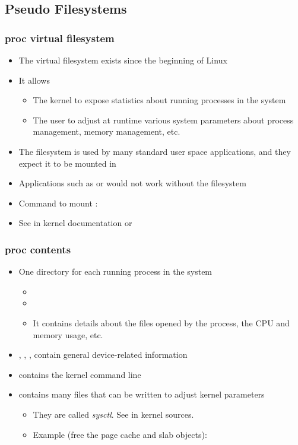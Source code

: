 \subsection{Pseudo Filesystems}
\begin{frame}
  \frametitle{proc virtual filesystem}
  \begin{itemize}
  \item The  virtual filesystem exists since the beginning of
    Linux
  \item It allows
    \begin{itemize}
    \item The kernel to expose statistics about running processes in
      the system
    \item The user to adjust at runtime various system parameters
      about process management, memory management, etc.
    \end{itemize}
  \item The  filesystem is used by many standard user space
    applications, and they expect it to be mounted in 
  \item Applications such as  or  would not work
    without the  filesystem
  \item Command to mount :\\
  \item See  in kernel documentation
        or 
  \end{itemize}
\end{frame}

\begin{frame}
  \frametitle{proc contents}
  \begin{itemize}
  \item One directory for each running process in the system
    \begin{itemize}
    \item {}
    \item {}
    \item It contains details about the files opened by the process,
      the CPU and memory usage, etc.
    \end{itemize}
  \item {}, ,
    , contain general device-related information
  \item {} contains the kernel command line
  \item {} contains many files that can be written to
    adjust kernel parameters
    \begin{itemize}
    \item They are called {\em sysctl}. See 
      in kernel sources.
    \item Example (free the page cache and slab objects):\\
    \end{itemize}
  \end{itemize}
\end{frame}

